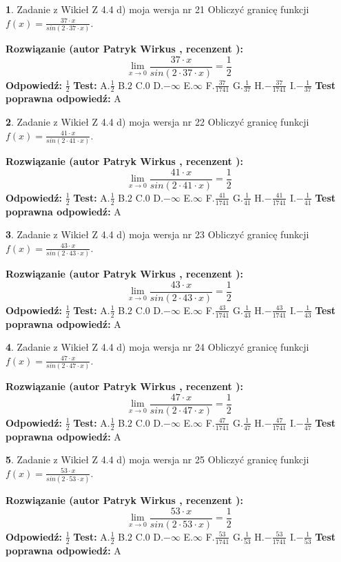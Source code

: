 \documentclass[12pt, a4paper]{article}
\theoremstyle{definition} %
\newtheorem{zad}{}
\newcommand{\zadStart}[1]{\begin{zad}#1\newline}
\newcommand{\zadStop}{\end{zad}}
\newcommand{\rozwStart}[2]{\noindent \textbf{Rozwiązanie (autor #1 , recenzent #2): }\newline}
\newcommand{\rozwStop}{\newline}
\newcommand{\odpStart}{\noindent \textbf{Odpowiedź:}\newline}
\newcommand{\odpStop}{\newline}
\newcommand{\testStart}{\noindent \textbf{Test:}\newline}
\newcommand{\testStop}{\newline}
\newcommand{\kluczStart}{\noindent \textbf{Test poprawna odpowiedź:}\newline}
\newcommand{\kluczStop}{\newline}
\begin{document}
\zadStart{Zadanie z Wikieł Z 4.4 d) moja wersja nr 21}
Obliczyć granicę funkcji $f(x)=\frac{37\cdot x}{sin(2 \cdot37\cdot x)}$.
\zadStop
\rozwStart{Patryk Wirkus}{}
$$\lim\limits_{x\to 0}\frac{37\cdot x}{sin(2 \cdot37\cdot x)}=\frac{1}{2}$$
\rozwStop
\odpStart
$\frac{1}{2}$
\odpStop
\testStart
A.$\frac{1}{2}$
B.$2$
C.$0$
D.$-\infty$
E.$\infty$
F.$\frac{37}{1741}$
G.$\frac{1}{37}$
H.$-\frac{37}{1741}$
I.$-\frac{1}{37}$
\testStop
\kluczStart
A
\kluczStop



\zadStart{Zadanie z Wikieł Z 4.4 d) moja wersja nr 22}
Obliczyć granicę funkcji $f(x)=\frac{41\cdot x}{sin(2 \cdot41\cdot x)}$.
\zadStop
\rozwStart{Patryk Wirkus}{}
$$\lim\limits_{x\to 0}\frac{41\cdot x}{sin(2 \cdot41\cdot x)}=\frac{1}{2}$$
\rozwStop
\odpStart
$\frac{1}{2}$
\odpStop
\testStart
A.$\frac{1}{2}$
B.$2$
C.$0$
D.$-\infty$
E.$\infty$
F.$\frac{41}{1741}$
G.$\frac{1}{41}$
H.$-\frac{41}{1741}$
I.$-\frac{1}{41}$
\testStop
\kluczStart
A
\kluczStop



\zadStart{Zadanie z Wikieł Z 4.4 d) moja wersja nr 23}
Obliczyć granicę funkcji $f(x)=\frac{43\cdot x}{sin(2 \cdot43\cdot x)}$.
\zadStop
\rozwStart{Patryk Wirkus}{}
$$\lim\limits_{x\to 0}\frac{43\cdot x}{sin(2 \cdot43\cdot x)}=\frac{1}{2}$$
\rozwStop
\odpStart
$\frac{1}{2}$
\odpStop
\testStart
A.$\frac{1}{2}$
B.$2$
C.$0$
D.$-\infty$
E.$\infty$
F.$\frac{43}{1741}$
G.$\frac{1}{43}$
H.$-\frac{43}{1741}$
I.$-\frac{1}{43}$
\testStop
\kluczStart
A
\kluczStop



\zadStart{Zadanie z Wikieł Z 4.4 d) moja wersja nr 24}
Obliczyć granicę funkcji $f(x)=\frac{47\cdot x}{sin(2 \cdot47\cdot x)}$.
\zadStop
\rozwStart{Patryk Wirkus}{}
$$\lim\limits_{x\to 0}\frac{47\cdot x}{sin(2 \cdot47\cdot x)}=\frac{1}{2}$$
\rozwStop
\odpStart
$\frac{1}{2}$
\odpStop
\testStart
A.$\frac{1}{2}$
B.$2$
C.$0$
D.$-\infty$
E.$\infty$
F.$\frac{47}{1741}$
G.$\frac{1}{47}$
H.$-\frac{47}{1741}$
I.$-\frac{1}{47}$
\testStop
\kluczStart
A
\kluczStop



\zadStart{Zadanie z Wikieł Z 4.4 d) moja wersja nr 25}
Obliczyć granicę funkcji $f(x)=\frac{53\cdot x}{sin(2 \cdot53\cdot x)}$.
\zadStop
\rozwStart{Patryk Wirkus}{}
$$\lim\limits_{x\to 0}\frac{53\cdot x}{sin(2 \cdot53\cdot x)}=\frac{1}{2}$$
\rozwStop
\odpStart
$\frac{1}{2}$
\odpStop
\testStart
A.$\frac{1}{2}$
B.$2$
C.$0$
D.$-\infty$
E.$\infty$
F.$\frac{53}{1741}$
G.$\frac{1}{53}$
H.$-\frac{53}{1741}$
I.$-\frac{1}{53}$
\testStop
\kluczStart
A
\kluczStop
\end{document}
